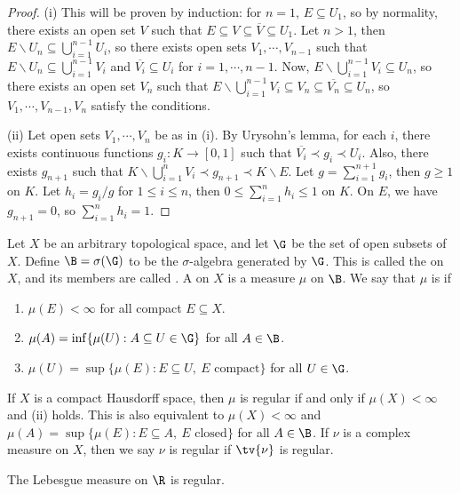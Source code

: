 \documentclass[a4paper]{article}
\begin{document}
\begin{proof}
  (i) This will be proven by induction: for $n=1$, $E\subseteq U_1$, so by normality, there exists an open set $V$ such that $E\subseteq V\subseteq\overline{V}\subseteq U_1$. Let $n>1$, then $E\backslash U_n\subseteq\bigcup_{i=1}^{n-1}U_i$, so there exists open sets $V_1,\cdots,V_{n-1}$ such that $E\backslash U_n\subseteq\bigcup_{i=1}^{n-1}V_i$ and $\overline{V_i}\subseteq U_i$ for $i=1,\cdots,n-1$. Now, $E\backslash\bigcup_{i=1}^{n-1}V_i\subseteq U_n$, so there exists an open set $V_n$ such that $E\backslash\bigcup_{i=1}^{n-1}V_i\subseteq V_n\subseteq\overline{V_n}\subseteq U_n$, so $V_1,\cdots,V_{n-1},V_n$ satisfy the conditions.

  (ii) Let open sets $V_1,\cdots,V_n$ be as in (i). By Urysohn's lemma, for each $i$, there exists continuous functions $g_i:K\to[0,1]$ such that $\overline{V_i}\prec g_i\prec U_i$. Also, there exists $g_{n+1}$ such that $K\backslash\bigcup_{i=1}^nV_i \prec g_{n+1}\prec K\backslash E$. Let $g=\sum_{i=1}^{n+1}g_i$, then $g\geq 1$ on $K$. Let $h_i=g_i/g$ for $1\leq i\leq n$, then $0\leq\sum_{i=1}^n h_i\leq 1$ on $K$. On $E$, we have $g_{n+1}=0$, so $\sum_{i=1}^n h_i=1$.
\end{proof}

Let $X$ be an arbitrary topological space, and let $\G$ be the set of open subsets of $X$. Define $\B=\sigma(\G)$ to be the $\sigma$-algebra generated by $\G$. This is called the  on $X$, and its members are called . A  on $X$ is a measure $\mu$ on $\B$. We say that $\mu$ is  if
\begin{enumerate}[label=(\roman*),nosep]
	\item $\mu(E)<\infty$ for all compact $E\subseteq X$.
	\item $\mu(A)=\inf\{\mu(U):A\subseteq U\in\G\}$ for all $A\in\B$.
	\item $\mu(U)=\sup\{\mu(E):E\subseteq U,\ E\text{ compact}\}$ for all $U\in\G$.
\end{enumerate}
If $X$ is a compact Hausdorff space, then $\mu$ is regular if and only if $\mu(X)<\infty$ and (ii) holds. This is also equivalent to $\mu(X)<\infty$ and $\mu(A)=\sup\{\mu(E):E\subseteq A,\ E\text{ closed}\}$ for all $A\in\B$. If $\nu$ is a complex measure on $X$, then we say $\nu$ is regular if $\tv{\nu}$ is regular.

\begin{eg}
  The Lebesgue measure on $\R$ is regular.
\end{eg}
\end{document}
